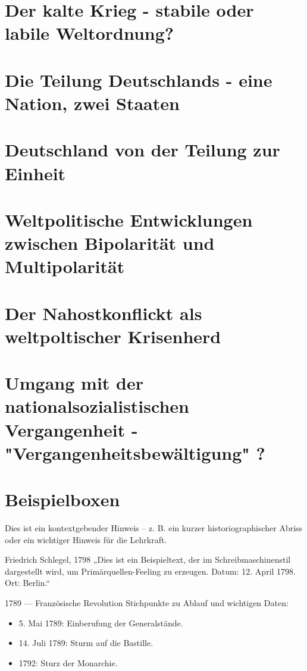 \documentclass[11pt,a4paper,oneside]{article}
\begin{document}
	
	
	
	\section{Der kalte Krieg - stabile oder labile Weltordnung?}
	\section{Die Teilung Deutschlands - eine Nation, zwei Staaten}
	\section{Deutschland von der Teilung zur Einheit}
	\section{Weltpolitische Entwicklungen zwischen Bipolarität und Multipolarität}
	\section{Der Nahostkonflickt als weltpoltischer Krisenherd}
	\section{Umgang mit der nationalsozialistischen Vergangenheit - "Vergangenheitsbewältigung" ?}
	
	\newpage
	
	\section{Beispielboxen}
	
	\begin{histnote}
		Dies ist ein kontextgebender Hinweis – z. B. ein kurzer historiographischer Abriss oder ein wichtiger Hinweis für die Lehrkraft.
	\end{histnote}

	
	\begin{primarysource}{Friedrich Schlegel, 1798}
		„Dies ist ein Beispieltext, der im Schreibmaschinenstil dargestellt wird, um Primärquellen-Feeling zu erzeugen.
		Datum: 12. April 1798. Ort: Berlin.“
	\end{primarysource}
	
	\begin{timeline}{1789 — Französische Revolution}
		Stichpunkte zu Ablauf und wichtigen Daten:
		\begin{itemize}
			\item 5. Mai 1789: Einberufung der Generalstände.
			\item 14. Juli 1789: Sturm auf die Bastille.
			\item 1792: Sturz der Monarchie.
		\end{itemize}
	\end{timeline}
	
\end{document}
